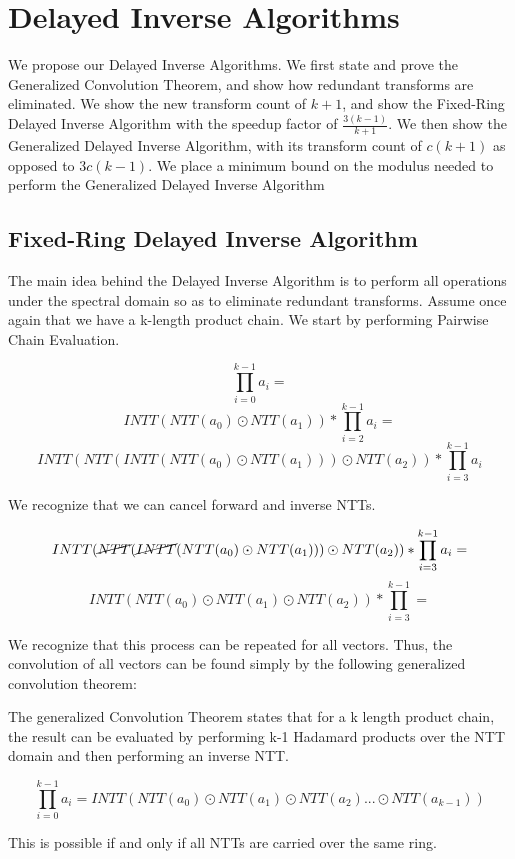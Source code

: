 \documentclass[runningheads]{llncs}
\begin{document}
\section{Delayed Inverse Algorithms}

We propose our Delayed Inverse Algorithms. We first state and prove the Generalized Convolution Theorem, and show how redundant transforms are eliminated. We show the new transform count of $k+1$, and show the Fixed-Ring Delayed Inverse Algorithm with the speedup factor of $\frac{3(k-1)}{k+1}$. We then show the Generalized Delayed Inverse Algorithm, with its transform count of $c(k+1)$ as opposed to $3c(k-1)$. We place a minimum bound on the modulus needed to perform the Generalized Delayed Inverse Algorithm
\subsection{Fixed-Ring Delayed Inverse Algorithm}

The main idea behind the Delayed Inverse Algorithm is to perform all operations under the spectral domain so as to eliminate redundant transforms. Assume once again that we have a k-length product chain. We start by performing Pairwise Chain Evaluation.

$$\prod_{i=0}^{k-1}a_{i}=$$
$$INTT(NTT(a_0)\odot NTT(a_1))*\prod_{i=2}^{k-1}a_i=$$
$$INTT(NTT(INTT(NTT(a_0)\odot NTT(a_1)))\odot NTT(a_2))*\prod^{k-1}_{i=3}a_i$$

We recognize that we can cancel forward and inverse NTTs.

$$INTT( \cancel{NTT}(\cancel{INTT}(NTT(a_0)\odot NTT(a_1)))\odot NTT(a_2))*\prod^{k-1}_{i=3}a_i=$$
$$INTT(NTT(a_{0})\odot NTT(a_1) \odot NTT(a_2))*\prod_{i=3}^{k-1}=$$

We recognize that this process can be repeated for all vectors. Thus, the convolution of all vectors can be found simply by the following generalized convolution theorem:

\begin{proposition}
    
    The generalized Convolution Theorem states that for a k length product chain, the result can be evaluated by performing k-1 Hadamard products over the NTT domain and then performing an inverse NTT.

    $$\prod_{i=0}^{k-1}a_i=INTT(NTT(a_0)\odot NTT(a_1) \odot NTT(a_2)... \odot NTT(a_{k-1}))$$

    This is possible if and only if all NTTs are carried over the same ring.
\end{proposition}
\end{document}
